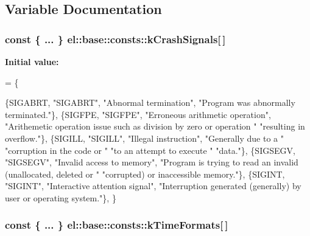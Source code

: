 \subsection{Variable Documentation}
\hypertarget{namespaceel_1_1base_1_1consts_ae148ad63452cb04651a6abe4f6b3f39c}{
\subsubsection[{k\-Crash\-Signals}]{\setlength{\rightskip}{0pt plus 5cm}const \{ ... \}   el\-::base\-::consts\-::k\-Crash\-Signals\mbox{[}$\,$\mbox{]}}}\label{namespaceel_1_1base_1_1consts_ae148ad63452cb04651a6abe4f6b3f39c}
{\bfseries Initial value\-:}
\begin{DoxyCode}
= \{
        
        
        \{SIGABRT,
         \textcolor{stringliteral}{"SIGABRT"},
         \textcolor{stringliteral}{"Abnormal termination"},
         \textcolor{stringliteral}{"Program was abnormally terminated."}\},
        \{SIGFPE,
         \textcolor{stringliteral}{"SIGFPE"},
         \textcolor{stringliteral}{"Erroneous arithmetic operation"},
         \textcolor{stringliteral}{"Arithemetic operation issue such as division by zero or operation "}
         \textcolor{stringliteral}{"resulting in overflow."}\},
        \{SIGILL,
         \textcolor{stringliteral}{"SIGILL"},
         \textcolor{stringliteral}{"Illegal instruction"},
         \textcolor{stringliteral}{"Generally due to a "}
         \textcolor{stringliteral}{"corruption in the code or "}
         \textcolor{stringliteral}{"to an attempt to execute "}
         \textcolor{stringliteral}{"data."}\},
        \{SIGSEGV,
         \textcolor{stringliteral}{"SIGSEGV"},
         \textcolor{stringliteral}{"Invalid access to memory"},
         \textcolor{stringliteral}{"Program is trying to read an invalid (unallocated, deleted or "}
         \textcolor{stringliteral}{"corrupted) or inaccessible memory."}\},
        \{SIGINT,
         \textcolor{stringliteral}{"SIGINT"},
         \textcolor{stringliteral}{"Interactive attention signal"},
         \textcolor{stringliteral}{"Interruption generated (generally) by user or operating system."}\},
    \}
\end{DoxyCode}
\hypertarget{namespaceel_1_1base_1_1consts_aebf5600a219b9313965789b468416edd}{
\subsubsection[{k\-Time\-Formats}]{\setlength{\rightskip}{0pt plus 5cm}const \{ ... \}   el\-::base\-::consts\-::k\-Time\-Formats\mbox{[}$\,$\mbox{]}}}\label{namespaceel_1_1base_1_1consts_aebf5600a219b9313965789b468416edd}
